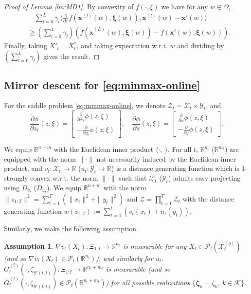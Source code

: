\documentclass[11pt,fullpage,letterpaper]{article}
\newcommand{\mc}{\mathcal}
\newcommand{\mb}{\mathbf}
\newcommand{\R}{\mathbb{R}}
\newcommand{\bx}{\boldsymbol{\xi}}
\newcommand{\bz}{\boldsymbol{\zeta}}
\newtheorem{assumption}{Assumption}[section]
\begin{document}
\begin{proof}[Proof of Lemma \ref{lm:MD1}]
By convexity of $f(\cdot,\xi)$ we have for any $w\in \Omega$, 
\begin{align*}
    &\quad \sum_{l=0}^L\gamma_l\langle \frac{\partial}{\partial x}f(\mb x^{(l)}(w),\bx(w)),\mb x^{(l)}(w)- \mb x'(w) \rangle\\
    &\geq  (\sum_{l=0}^L\gamma_l)(f(\widetilde{\mb x}^{(L)}(w),\bx(w))-f(\mb x'(w),\bx(w))).
\end{align*}
Finally, taking $X'_t = X^*_t$, and taking expectation w.r.t. $w$ and dividing by $ (\sum_{l=0}^L\gamma_l)$ gives the result. 
\end{proof}




\subsection{Mirror descent for \eqref{eq:minmax-online}}\label{sec:md_saddle}

For the saddle problem \eqref{eq:minmax-online}, we denote $\mc Z_t = \mc X_t\times \mc Y_t$, and 
\begin{equation}\label{eq:def-phi-grad}
    \frac{\tilde{\partial} \phi}{\partial z_t}(z,\xi) = \begin{bmatrix}
    \frac{\partial}{\partial x_t}\phi(z,\xi)\\-\frac{\partial}{\partial y_t}\phi(z,\xi)
\end{bmatrix},\quad \frac{\tilde{\partial} \phi}{\partial z}(z,\xi) = \begin{bmatrix}
    \frac{\partial}{\partial x}\phi(z,\xi)\\-\frac{\partial}{\partial y}\phi(z,\xi)
\end{bmatrix}.
\end{equation}


We equip $\R^{n+m}$ with the Euclidean inner product $\langle \cdot,\cdot \rangle$. For all $t$, $\R^{n_t}$ ($\R^{m_t}$) are equipped with the norm $\|\cdot\|$ not necessarily induced by the Euclidean inner product, and $v_t:\mc X_t\to \R$ ($u_t:\mc Y_t\to \R$) is a distance generating function which is $1$-strongly convex w.r.t. the norm $\|\cdot \|$ such that $\mc X_t$ ($\mc Y_t$) admits easy projecting using $D_{v_t}$ ($D_{u_t}$). We equip $\R^{n+m}$ with the norm $\|z_{1:T}\|^2 = \sum_{t=1}^T (\|x_t\|^2 + \|y_t\|^2)$ and $\mc Z=\prod_{t=1}^T \mc Z_t$ with the distance generating function $w(z_{1:T}):=\sum_{t=1}^t (v_t(x_t) + u_t(y_t))$. 

Similarly, we make the following assumption.
\begin{assumption}\label{assumption:measurable-saddle}
     $\nabla v_t(X_t):\Xi_{1:t}\to \R^{n_t}$ is measurable for any $X_t\in \mc P_t(\mc X_t^{(o)})$ (and so $\nabla v_t(X_t)\in \mc P_t(\R^{n_t})$), and similarly for $u_t$. $\overline{G}_t^{(l)}(\cdot,\zeta_{S'(t,l)}):\Xi_{1:t}\to \R^{n_t+m_t}$ is measurable (and so $\overline{G}_t^{(l)}(\cdot,\zeta_{S'(t,l)})\in  \mc P_t(\R^{n_t+m_t})$) for all possible realizations $\{\bz_k = \zeta_{k},~k\in \mc K\}$.
\end{assumption}
\end{document}
